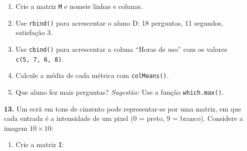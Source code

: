 \documentclass[
  portuguese,
  11pt,
  openany]{book}
\providecommand{\tightlist}{%
  \setlength{\itemsep}{0pt}\setlength{\parskip}{0pt}}
\begin{document}
\begin{enumerate}
\def\labelenumi{(\alph{enumi})}
\tightlist
\item
  Crie a matriz \texttt{M} e nomeie linhas e colunas.
\item
  Use \texttt{rbind()} para acrescentar o aluno D: 18 perguntas, 11 segundos,
  satisfação 3.
\item
  Use \texttt{cbind()} para acrescentar a coluna ``Horas de uso'' com os valores
  \texttt{c(5,\ 7,\ 6,\ 8)}.
\item
  Calcule a média de cada métrica com \texttt{colMeans()}.
\item
  Que aluno fez mais perguntas?
  \emph{Sugestão:} Use a função \texttt{which.max()}.
\end{enumerate}

\textbf{13.} Um ecrã em tons de cinzento pode representar-se por uma matriz, em que
cada entrada é a intensidade de um pixel (0 = preto, 9 = branco). Considere a
imagem \(10 \times 10\):

\begin{enumerate}
\def\labelenumi{(\alph{enumi})}
\tightlist
\item
  Crie a matriz \texttt{I}:
\end{enumerate}
\end{document}
